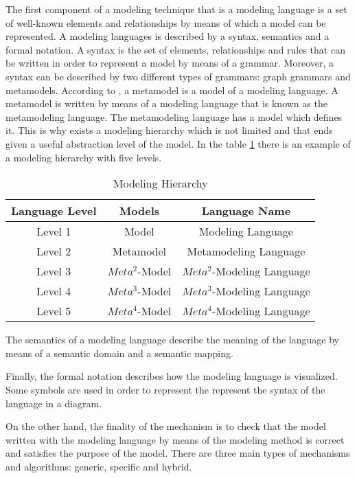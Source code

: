 The first component of a modeling technique that is a modeling language is a set of well-known elements and relationships by means of which a model can be represented. A modeling languages is described by a syntax, semantics and a formal notation. A syntax is the set of elements, relationships and rules that can be written in order to represent a model by means of a grammar. Moreover, a syntax can be described by two different types of grammars: graph grammars and metamodels. According to \cite{metamodelwebsite}, a metamodel is a model of a modeling language. A metamodel is written by means of a modeling language that is known as the metamodeling language. The metamodeling language has a model which defines it. This is why exists a modeling hierarchy which is not limited and that ends given a useful abstraction level of the model. In the table \ref{Modeling Hierarchy} there is an example of a modeling hierarchy with five levels.

\begin{table}[h!]
\centering
	\begin{tabular}{||c|c|c||} 
	\hline\hline
	Language Level & Models & Language Name \\ [1ex] 
	\hline\hline
	Level 1 & Model & Modeling Language  \\
	\hline
	Level 2 & Metamodel & Metamodeling Language  \\
	\hline
	Level 3 & $Meta^2$-Model & $Meta^2$-Modeling Language  \\
	\hline
	Level 4 & $Meta^3$-Model & $Meta^3$-Modeling Language  \\
	\hline
	Level 5 & $Meta^4$-Model & $Meta^4$-Modeling Language  \\
	\hline\hline
	\end{tabular}
\caption{Modeling Hierarchy}
\label{Modeling Hierarchy}
\end{table}

The semantics of a modeling language describe the meaning of the language by means of a semantic domain and a semantic mapping.

Finally, the formal notation describes how the modeling language is visualized. Some symbols are used in order to represent the represent the syntax of the language in a diagram.

On the other hand, the finality of the mechanism is to check that the model written with the modeling language by means of the modeling method is correct and satisfies the purpose of the model. There are three main types of mechanisms and algorithms: generic, specific and hybrid.

